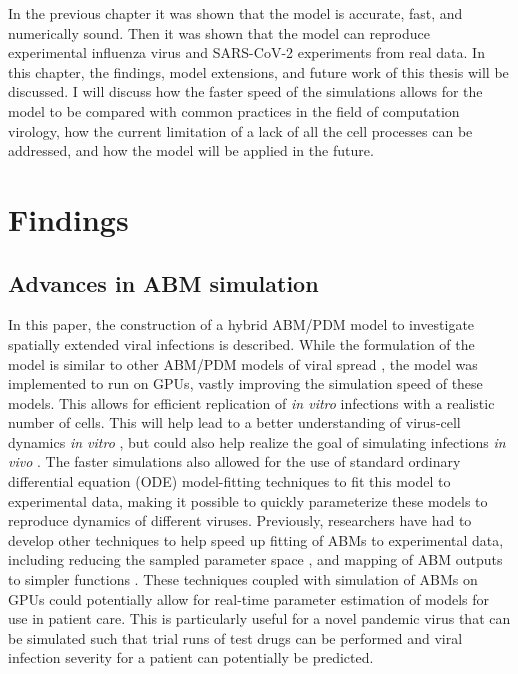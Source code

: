 
In the previous chapter it was shown that the model is accurate, fast, and numerically sound. Then it was shown that the model can reproduce experimental influenza virus and SARS-CoV-2 experiments from real data. In this chapter, the findings, model extensions, and future work of this thesis will be discussed. I will discuss how the faster speed of the simulations allows for the model to be compared with common practices in the field of computation virology, how the current limitation of a lack of all the cell processes can be addressed, and how the model will be applied in the future.

\section{Findings} \label{findings}

\subsection{Advances in ABM simulation}

In this paper, the construction of a hybrid ABM/PDM model to investigate spatially extended viral infections is described. While the formulation of the model is similar to other ABM/PDM models of viral spread \citep{beauchemin_simple_2005, bauer_agent-based_2009}, the model was implemented to run on GPUs, vastly improving the simulation speed of these models. This allows for efficient replication of \emph{in vitro} infections with a realistic number of cells. This will help lead to a better understanding of virus-cell dynamics \emph{in vitro} \citep{blahut21}, but could also help realize the goal of simulating infections \emph{in vivo} \citep{laubenbacher21}. The faster simulations also allowed for the use of standard ordinary differential equation (ODE) model-fitting techniques to fit this model to experimental data, making it possible to quickly parameterize these models to reproduce dynamics of different viruses. Previously, researchers have had to develop other techniques to help speed up fitting of ABMs to experimental data, including reducing the sampled parameter space \citep{li17}, and mapping of ABM outputs to simpler functions \citep{tong_development_2015, read16}. These techniques coupled with simulation of ABMs on GPUs could potentially allow for real-time parameter estimation of models for use in patient care. This is particularly useful for a novel pandemic virus that can be simulated such that trial runs of test drugs can be performed and viral infection severity for a patient can potentially be predicted.

